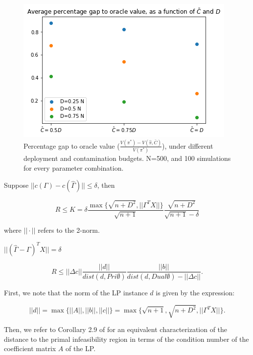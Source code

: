 \documentclass[11pt,a4paper]{article}
\begin{document}
\begin{figure}[!h]
\begin{center}
\includegraphics[scale=0.5]{simplot}
\caption{Percentage gap to oracle value ($\frac{ V(\pi^*) - V(\hat \pi, \bar{C})}{V(\pi^*) }$), under different deployment and contamination budgets. N=500, and 100 simulations for every parameter combination.}
\end{center}
\end{figure}




Suppose $||c(\Gamma) - c(\hat{\Gamma})|| \leq \delta$, then

$$ R \leq K = \delta \frac{ \max \{ \sqrt{n+D^2}, || \Gamma^T X || \} }{ \sqrt{n+1} } \frac{ \sqrt{n+D^2} }{\sqrt{n+1} - \delta } $$

where $|| \cdot ||$ refers to the 2-norm.

$ || (\hat{\Gamma} - \Gamma)^T X || = \delta $


$$ R \leq  || \Delta c || \frac{ ||d ||  }{ dist(d, Pri\emptyset) } \frac{||b||}{dist(d, Dual\emptyset)- || \Delta c || }. $$

First, we note that the norm of the LP instance $d$ is given by the expression:

$$||d ||  = \max \{ ||A || , ||b || , ||c ||  \} = \max \{ \sqrt{n+1}, \sqrt{n+D^2}, || \Gamma^T X || \} . $$

Then, we refer to Corollary 2.9 of \cite{pena2003characterization} for an equivalent characterization of the distance to the primal infeasibility region in terms of the condition number of the coefficient matrix $A$ of the LP. 
\end{document}
